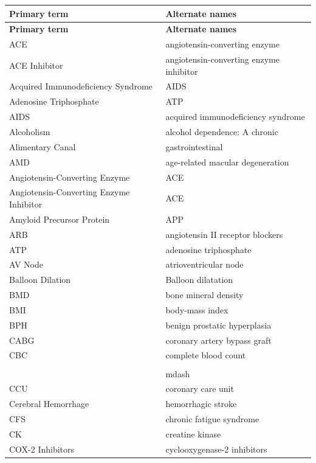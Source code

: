 \small
\setlength{\LTleft}{0pt}
\setlength{\LTright}{0pt}
\begin{longtable}{>{\raggedright\arraybackslash}p{} >{\raggedright\arraybackslash}p{}}
\toprule
\textbf{Primary term} & \textbf{Alternate names} \\
\midrule
\endfirsthead
\toprule
\textbf{Primary term} & \textbf{Alternate names} \\
\midrule
\endhead
\bottomrule
\endfoot

ACE & angiotensin-converting enzyme \\
ACE Inhibitor & angiotensin-converting enzyme inhibitor \\
Acquired Immunodeficiency Syndrome & AIDS \\
Adenosine Triphosphate & ATP \\
AIDS & acquired immunodeficiency syndrome \\
Alcoholism & alcohol dependence: A chronic \\
Alimentary Canal & gastrointestinal \\
AMD & age-related macular degeneration \\
Angiotensin-Converting Enzyme & ACE \\
Angiotensin-Converting Enzyme Inhibitor & ACE \\
Amyloid Precursor Protein & APP \\
ARB & angiotensin II receptor blockers \\
ATP & adenosine triphosphate \\
AV Node & atrioventricular node \\
Balloon Dilation & Balloon dilatation \\
BMD & bone mineral density \\
BMI & body-mass index \\
BPH & benign prostatic hyperplasia \\
CABG & coronary artery bypass graft \\
CBC & complete blood count\\\\&mdash \\
CCU & coronary care unit \\
Cerebral Hemorrhage & hemorrhagic stroke \\
CFS & chronic fatigue syndrome \\
CK & creatine kinase \\
COX-2 Inhibitors & cyclooxygenase-2 inhibitors \\

\end{longtable}
